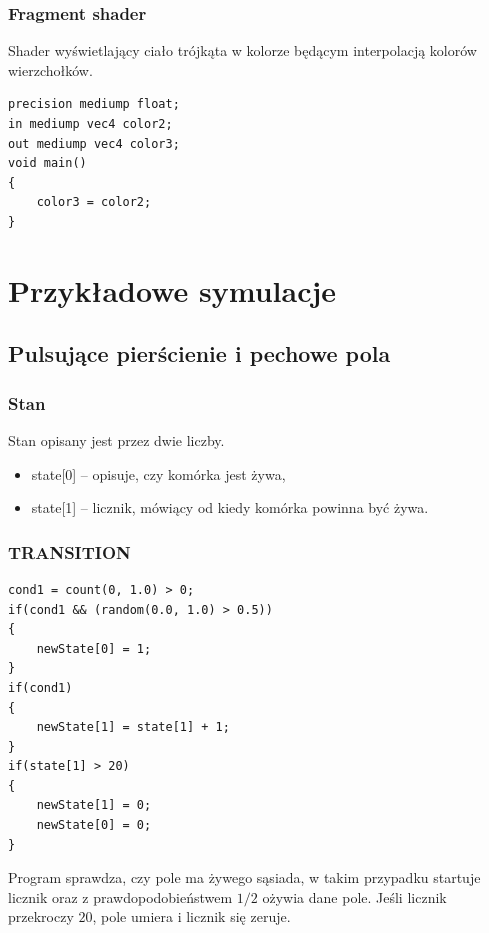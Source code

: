 \documentclass[declaration,shortabstract, inz]{iithesis}
\theoremstyle{definition} \newtheorem{definition}{Definicja}[]
\theoremstyle{plain} \newtheorem{remark}[definition]{Obserwacja}
\theoremstyle{plain} \newtheorem{theorem}[definition]{Twierdzenie}
\theoremstyle{plain} \newtheorem{example}{Przykład}[definition]
\theoremstyle{plain} \newtheorem{lemma}[definition]{Lemat}
\begin{document}
\subsection{Fragment shader}
Shader wyświetlający ciało trójkąta w kolorze będącym interpolacją kolorów wierzchołków.
\begin{center}
\begin{lstlisting}
precision mediump float;
in mediump vec4 color2;
out mediump vec4 color3;
void main()
{
	color3 = color2;
}
\end{lstlisting}
\end{center}

\chapter{Przykładowe symulacje}

\section{Pulsujące pierścienie i pechowe pola}

\subsection{Stan}
Stan opisany jest przez dwie liczby.
\begin{itemize}
\item state[0] -- opisuje, czy komórka jest żywa,
\item state[1] -- licznik, mówiący od kiedy komórka powinna być żywa.
\end{itemize}

\subsection{TRANSITION}

\begin{center}
\begin{lstlisting}
cond1 = count(0, 1.0) > 0;
if(cond1 && (random(0.0, 1.0) > 0.5))
{
    newState[0] = 1;
}
if(cond1)
{
    newState[1] = state[1] + 1;
}
if(state[1] > 20)
{
    newState[1] = 0;
    newState[0] = 0;
} 
\end{lstlisting}
\end{center}

Program sprawdza, czy pole ma żywego sąsiada, w takim przypadku startuje licznik oraz  z prawdopodobieństwem $1/2$ ożywia dane pole. Jeśli licznik przekroczy $20$, pole umiera i licznik się zeruje.
\end{document}
